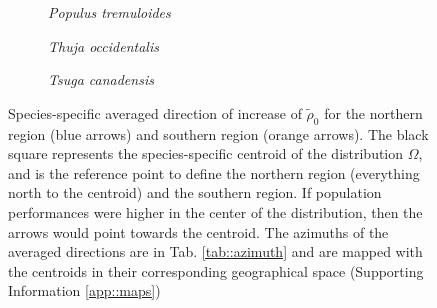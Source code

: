 \begin{figure}[htb]
\begin{subfigure}{0.25\textwidth}
		\label{fig::pinstr_az}
	\end{subfigure}
	\hfil
	\begin{subfigure}{0.25\textwidth}
		
		\caption{\textit{Populus tremuloides}}
		\label{fig::poptre_az}
	\end{subfigure}
	\medskip
	\begin{subfigure}{0.25\textwidth}
		
		\caption{\textit{Thuja occidentalis}}
		\label{fig::thuocc_az}
	\end{subfigure}
	\hfil
	\begin{subfigure}{0.25\textwidth}
		
		\caption{\textit{Tsuga canadensis}}
		\label{fig::tsucan_az}
	\end{subfigure}
	\hfil
	\begin{subfigure}{0.25\textwidth}
		
	\end{subfigure}
	\caption{Species-specific averaged direction of increase of $ \tilde \rho_0 $ for the northern region (blue arrows) and southern region (orange arrows). The black square represents the species-specific centroid of the distribution $ \Omega $, and is the reference point to define the northern region (everything north to the centroid) and the southern region. If population performances were higher in the center of the distribution, then the arrows would point towards the centroid. The azimuths of the averaged directions are in Tab. \ref{tab::azimuth} and are mapped with the centroids in their corresponding geographical space (Supporting Information \ref{app::maps}) \label{fig::grad_cols}}
\end{figure}

